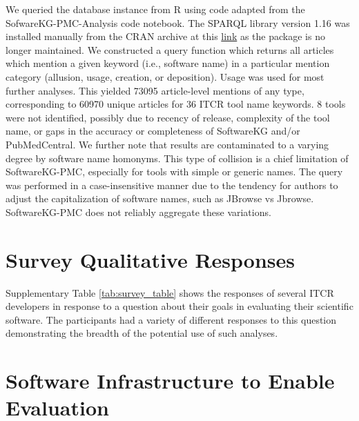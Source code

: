 \documentclass{article}
\begin{document}
We queried the database instance from R using code adapted from the SofwareKG-PMC-Analysis code notebook. The SPARQL library version 1.16 was installed manually from the CRAN archive at this \href{https://urldefense.com/v3/__https://cran.r-project.org/src/contrib/Archive/SPARQL/__;!!GuAItXPztq0!hBzPcpXZ3SCNtkVgVI9KgwxhTOgm6JY1gKzCzCFfer1uhtTUx-sWnQyzKdfDCT0yogPVN8-gs4KZy97R-JH4PN6VyojsQgQ$}{link} as the package is no longer maintained. We constructed a query function which returns all articles which mention a given keyword (i.e., software name) in a particular mention category (allusion, usage, creation, or deposition). Usage was used for most further analyses. This yielded 73095 article-level mentions of any type, corresponding to 60970 unique articles for 36 ITCR tool name keywords. 8 tools were not identified, possibly due to recency of release, complexity of the tool name, or gaps in the accuracy or completeness of SoftwareKG and/or PubMedCentral. We further note that results are contaminated to a varying degree by software name homonyms. This type of collision is a chief limitation of SoftwareKG-PMC, especially for tools with simple or generic names. The query was performed in a case-insensitive manner due to the tendency for authors to adjust the capitalization of software names, such as JBrowse vs Jbrowse. SoftwareKG-PMC does not reliably aggregate these variations.

\section{Survey Qualitative Responses}
\label{sec-supp-survey}

Supplementary Table \ref{tab:survey_table} shows the responses of several ITCR developers in response to a question about their goals in evaluating their scientific software. The participants had a variety of different responses to this question demonstrating the breadth of the potential use of such analyses.





\section{Software Infrastructure to Enable Evaluation}
\label{sec-supp-note-inf}
\end{document}
